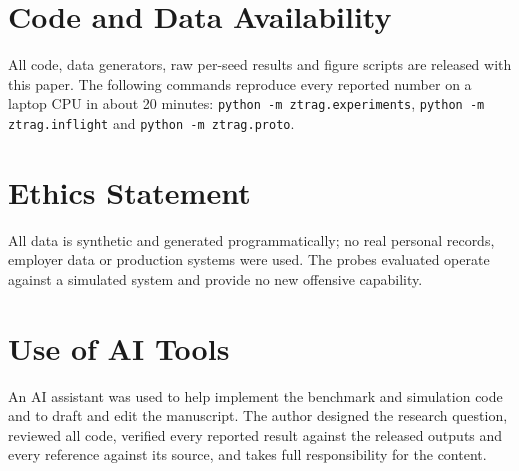 \documentclass[10pt]{article}
\begin{document}
\section*{Code and Data Availability}
All code, data generators, raw per-seed results and figure scripts are released with this paper.
The following commands reproduce every reported number on a laptop CPU in about 20 minutes: \texttt{python -m ztrag.experiments}, \texttt{python -m ztrag.inflight} and \texttt{python -m ztrag.proto}.

\section*{Ethics Statement}
All data is synthetic and generated programmatically; no real personal records, employer data or production systems were used. The probes evaluated operate against a simulated system and provide no new offensive capability.

\section*{Use of AI Tools}
An AI assistant was used to help implement the benchmark and simulation code and to draft and edit the manuscript. The author designed the research question, reviewed all code, verified every reported result against the released outputs and every reference against its source, and takes full responsibility for the content.



\end{document}
